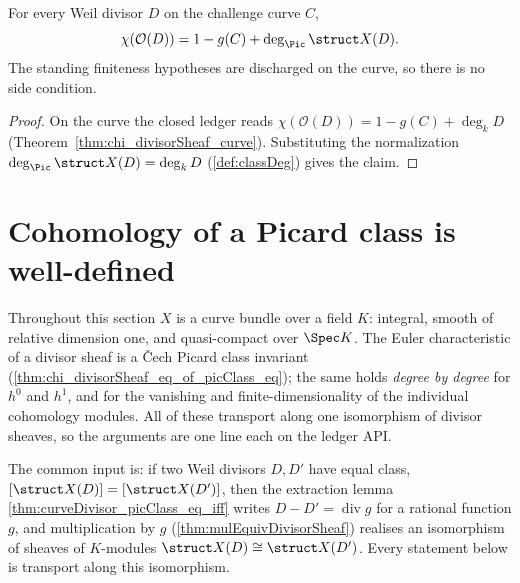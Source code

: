 \begin{theorem}
  \label{thm:chi_divisorSheaf_classDeg_curve}
  \leanok
  For every Weil divisor \(D\) on the challenge curve \(C\),
  \[
    \chi(\mathcal O(D)) = 1 - g(C) + \deg_{\Pic}\struct X(D) .
  \]
  The standing finiteness hypotheses are discharged on the curve, so there is no side condition.
\end{theorem}
\begin{proof}
  \leanok
  On the curve the closed ledger reads \(\chi(\mathcal O(D)) = 1 - g(C) + \deg_k D\)
  (Theorem~\ref{thm:chi_divisorSheaf_curve}). Substituting the normalization \(\deg_{\Pic}\struct
  X(D) = \deg_k D\) (\ref{def:classDeg}) gives the claim.
\end{proof}

\section{Cohomology of a Picard class is well-defined}
\label{sec:classCohomology}

Throughout this section \(X\) is a curve bundle over a field \(K\): integral, smooth of relative
dimension one, and quasi-compact over \(\Spec K\). The Euler characteristic of a divisor sheaf
is a \v Cech Picard class invariant (\ref{thm:chi_divisorSheaf_eq_of_picClass_eq}); the same
holds \emph{degree by degree} for \(h^0\) and \(h^1\), and for the vanishing and
finite-dimensionality of the individual cohomology modules. All of these transport along one
isomorphism of divisor sheaves, so the arguments are one line each on the ledger API.

The common input is: if two Weil divisors \(D, D'\) have equal class, \([\struct X(D)] =
[\struct X(D')]\), then the extraction lemma \ref{thm:curveDivisor_picClass_eq_iff} writes \(D -
D' = \operatorname{div} g\) for a rational function \(g\), and multiplication by \(g\)
(\ref{thm:mulEquivDivisorSheaf}) realises an isomorphism of sheaves of \(K\)-modules \(\struct
X(D) \cong \struct X(D')\). Every statement below is transport along this isomorphism.

